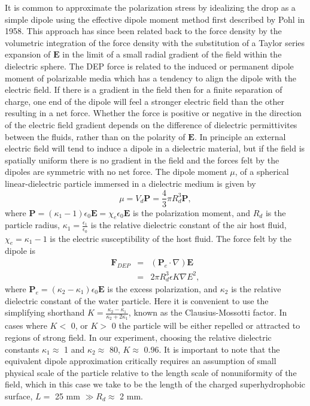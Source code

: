 \documentclass[12pt,a4paper,oneside]{book}
\begin{document}
It is common to approximate the polarization stress by idealizing the drop as a simple dipole using the effective dipole moment method first described by Pohl in 1958\cite{pohl_effects_1958}. This approach has since been related back to the force density by the volumetric integration of the force density with the substitution of a Taylor series expansion of $\mathbf{E}$ in the limit of a small radial gradient of the field within the dielectric sphere\cite{wang_general_1997}. The DEP force is related to the induced or permanent dipole moment of polarizable media which has a tendency to align the dipole with the electric field. If there is a gradient in the field then for a finite separation of charge, one end of the dipole will feel a stronger electric field than the other resulting in a net force. Whether the force is positive or negative in the direction of the electric field gradient depends on the difference of dielectric permittivites between the fluids, rather than on the polarity of $\mathbf{E}$. In principle an external electric field will tend to induce a dipole in a dielectric material, but if the field is spatially uniform there is no gradient in the field and the forces felt by the dipoles are symmetric with no net force. The dipole moment $\mu$, of a spherical linear-dielectric particle immersed in a dielectric medium is given by
\begin{equation} \label{dipole_m_1}
\mu = V_d \mathbf{P} = \frac{4}{3} \pi R_d^3 \mathbf{P},
\end{equation} 
where $\mathbf{P} = \left(\kappa_1 - 1 \right) \epsilon_0 \mathbf{E} = \chi_e \epsilon_0 \mathbf{E}$ is the polarization moment, and $R_d$ is the particle radius, $\kappa_1 = \frac{\epsilon_1}{\epsilon_0}$ is the relative dielectric constant of the air host fluid, $\chi_e = \kappa_1 - 1$ is the electric susceptibility of the host fluid. The force felt by the dipole is 
\begin{eqnarray} \label{dep_force}
\mathbf{F}_{DEP} &=& \left( \mathbf{P}_e \cdot \nabla \right) \mathbf{E} \nonumber \\
&=& 2 \pi R_d^3 \epsilon K \nabla E^2,
\end{eqnarray}
where $\mathbf{P}_e=(\kappa_2 - \kappa_1)\epsilon_0 \mathbf{E}$ is the excess polarization, and $\kappa_2$ is the relative dielectric constant of the water particle. Here it is convenient to use the simplifying shorthand $K = \frac{\kappa_2 - \kappa_1}{\kappa_2 + 2 \kappa_1}$, known as the Clausius-Mossotti factor. In cases where $K <$ 0, or $K>$ 0 the particle will be either repelled or attracted to regions of strong field. In our experiment, choosing the relative dielectric constants $\kappa_1 \approx$ 1 and $\kappa_2 \approx$ 80, $K \approx$ 0.96. It is important to note that the equivalent dipole approximation critically requires an assumption of small physical scale of the particle relative to the length scale of nonuniformity of the field, which in this case we take to be the length of the charged superhydrophobic surface, $L =$ 25 mm $\gg R_d \approx$ 2 mm.
\end{document}
